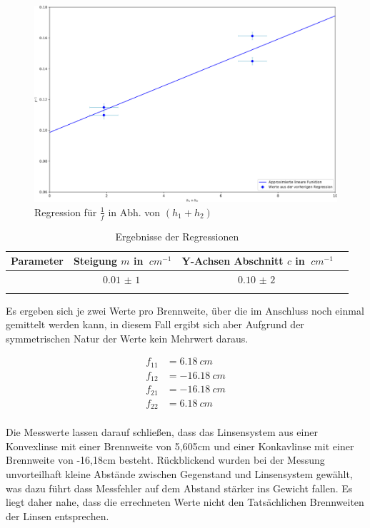 \begin{figure}[h!]{}
    \begin{center}
        \includegraphics[scale=0.4]{./fig/Abbe_h1h2_Plot.pdf}
        \caption{Regression für $\frac{1}{f}$ in Abh. von $(h_1 + h_2)$}
        \label{fig:Abbe-Regress-h1h2}
    \end{center}
\end{figure}

\begin{table}[h!]
    \begin{center}
        \caption{Ergebnisse der Regressionen}
        \begin{tabular}{cccc}
            \hline
            Parameter & Steigung $m$ in $\SI{}{cm^{-1}}$   & Y-Achsen Abschnitt $c$ in $\SI{}{cm^{-1}}$\\
            \hline
                     & $\SI{0,01(1)}{}$   & $\SI{0,10(2)}{}$ \\
            \hline
            \label{tab:abbe-Regression-results}
        \end{tabular}
    \end{center}
\end{table}

Es ergeben sich je zwei Werte pro Brennweite, über die im Anschluss noch einmal gemittelt werden kann, in diesem Fall ergibt sich aber Aufgrund der symmetrischen Natur der Werte kein Mehrwert daraus.


\begin{align}
    f_{11} &= \SI{6,18}{cm} \\
    f_{12} &= \SI{-16,18}{cm} \\
    f_{21} &= \SI{-16,18}{cm} \\
    f_{22} &= \SI{6,18}{cm} \\
\end{align}

Die Messwerte lassen darauf schließen, dass das Linsensystem aus einer Konvexlinse mit einer Brennweite von 5,605cm und einer Konkavlinse mit einer Brennweite von -16,18cm besteht.
Rückblickend wurden bei der Messung unvorteilhaft kleine Abstände zwischen Gegenstand und Linsensystem gewählt, was dazu führt dass Messfehler auf dem Abstand stärker ins Gewicht fallen.
Es liegt daher nahe, dass die errechneten Werte nicht den Tatsächlichen Brennweiten der Linsen entsprechen.